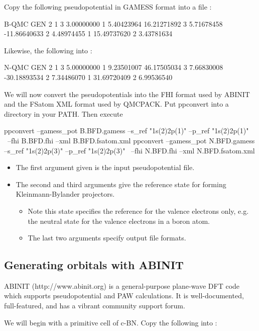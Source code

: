 Copy the following pseudopotential in GAMESS format into a file :
\begin{code}
B-QMC GEN 2 1
3
3.00000000 1 5.40423964
16.21271892 3 5.71678458
-11.86640633 2 4.48974455
1
15.49737620 2 3.43781634
\end{code}

Likewise, the following into :
\begin{code}
N-QMC GEN 2 1
3
5.00000000 1 9.23501007
46.17505034 3 7.66830008
-30.18893534 2 7.34486070
1
31.69720409 2 6.99536540
\end{code}

We will now convert the pseudopotentials into the FHI format used by ABINIT and the FSatom XML format used by QMCPACK. Put ppconvert into a directory in your PATH. Then execute
\begin{code}
ppconvert --gamess_pot B.BFD.gamess --s_ref "1s(2)2p(1)" --p_ref "1s(2)2p(1)" \
          --fhi B.BFD.fhi --xml B.BFD.fsatom.xml
ppconvert --gamess_pot N.BFD.gamess --s_ref "1s(2)2p(3)" --p_ref "1s(2)2p(3)" \
          --fhi N.BFD.fhi --xml N.BFD.fsatom.xml
\end{code}
\begin{itemize}
  \item{} The first argument given is the input pseudopotential file.
  \item{} The second and third arguments give the reference state for forming Kleinmann-Bylander projectors.
  \begin{itemize}
    \item{} Note this state specifies the reference for the valence electrons only, e.g. the neutral state for the valence electrons in a boron atom.
    \item{} The last two arguments specify output file formats. 
  \end{itemize}
\end{itemize}

\subsection*{Generating orbitals with ABINIT}
ABINIT (http://www.abinit.org) is a general-purpose plane-wave DFT code which supports pseudopotential and PAW calculations.  It is well-documented, full-featured, and has a vibrant community support forum.

We will begin with a primitive cell of c-BN. Copy the following into \iconsole{cBNprim.in}:

